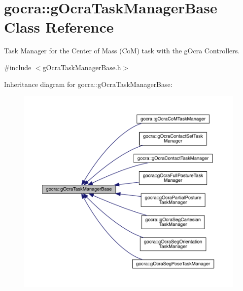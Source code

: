 \hypertarget{classgocra_1_1gOcraTaskManagerBase}{}\section{gocra\+:\+:g\+Ocra\+Task\+Manager\+Base Class Reference}
\label{classgocra_1_1gOcraTaskManagerBase}


Task Manager for the Center of Mass (CoM) task with the g\+Ocra Controllers.  




{\ttfamily \#include $<$g\+Ocra\+Task\+Manager\+Base.\+h$>$}



Inheritance diagram for gocra\+:\+:g\+Ocra\+Task\+Manager\+Base\+:\nopagebreak
\begin{figure}[H]
\begin{center}
\leavevmode
\includegraphics[width=350pt]{da/dd1/classgocra_1_1gOcraTaskManagerBase__inherit__graph}
\end{center}
\end{figure}


